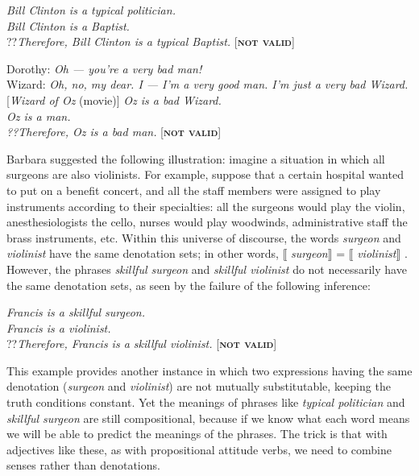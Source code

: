 \ea \label{ex:15.6}
\textit{Bill Clinton is a typical politician.}\\
\textit{Bill Clinton is a Baptist.}\\\FelixHRule
??\textit{Therefore, Bill Clinton is a typical Baptist.} \hfill  [\textbf{\textsc{not valid}}]
\z

\ea \label{ex:15.7}
\ea  Dorothy: \textit{Oh — you’re a very bad man!}\\
Wizard: \textit{Oh, no, my dear. I — I’m a very good man. I’m just a very bad Wizard.} [\textit{Wizard of Oz} (movie)]
\ex  
  \textit{Oz is a bad Wizard.}\\
\textit{Oz is a man.\\
\FelixHRule
??Therefore, Oz is a bad man.}  \hfill [\textbf{\textsc{not valid}}]
\z \z


Barbara \citet{Partee1995} suggested the following illustration: imagine a situation in which all surgeons are also violinists. For example, suppose that a certain hospital wanted to put on a benefit concert, and all the staff members were assigned to play instruments according to their specialties: all the surgeons would play the violin, anesthesiologists the cello, nurses would play woodwinds, administrative staff the brass instruments, etc. Within this universe of discourse, the words \textit{surgeon} and \textit{violinist} have the same denotation sets; in other words, $\llbracket$ \textit{surgeon}$\rrbracket$  = $\llbracket$ \textit{violinist}$\rrbracket$ . However, the phrases \textit{skillful surgeon} and \textit{skillful violinist} do not necessarily have the same denotation sets, as seen by the failure of the following inference:


\ea \label{ex:15.8}
\textit{Francis is a skillful surgeon.}\\
\textit{Francis is a violinist.}\\
\FelixHRule
??\textit{Therefore, Francis is a skillful violinist.}  \hfill [\textbf{\textsc{not valid}}]
\z


This example provides another instance in which two expressions having the same denotation (\textit{surgeon} and \textit{violinist}) are not mutually substitutable, keeping the truth conditions constant. Yet the meanings of phrases like \textit{typical politician} and \textit{skillful surgeon} are still compositional, because if we know what each word means we will be able to predict the meanings of the phrases. The trick is that with adjectives like these, as with propositional attitude verbs, we need to combine senses rather than denotations.



